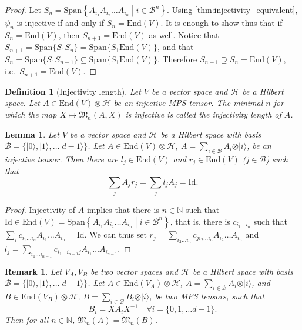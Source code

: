 \documentclass{article}
\newtheorem{lemma}{Lemma}
\newtheorem{remark}{Remark}
\newtheorem{definition}{Definition}
\newcommand{\id}{\mathrm{Id}}
\newcommand{\End}{\mathrm{End}}
\newcommand{\ket}[1]{\vert #1 \rangle}
\newcommand{\Span}{\mathrm{Span}}
\begin{document}
\begin{proof}
  Let $S_n = \Span\left\{A_{i_1} A_{i_2} \dots A_{i_n} \middle| i\in \mathcal{B}^n \right\}$. Using \cref{thm:injectivity_equivalent}, $\psi_n$ is injective if and only if $S_n = \End(V)$. It is enough to show thus that if $S_n = \End(V)$, then $S_{n+1} = \End(V)$ as well. Notice that $S_{n+1} = \Span\{S_1 S_n\} = \Span\{ S_1 \End(V)\}$, and that $S_{n} = \Span\{S_1 S_{n-1}\} \subseteq \Span\{S_1 \End(V)\}$. Therefore $S_{n+1} \supseteq S_n = \End(V)$, i.e.\ $S_{n+1} = \End(V)$. 
\end{proof}

\begin{definition}[Injectivity length]
    Let $V$ be a vector space and $\mathcal{H}$ be a Hilbert space. Let $A\in \End(V)\otimes \mathcal{H}$ be an \emph{injective} MPS tensor. The minimal $n$ for which the map $X\mapsto \mathfrak{M}_n(A,X)$ is injective is called the \emph{injectivity length} of $A$.
\end{definition}

\begin{lemma}\label{lem:injective_l_r_inverse}
  Let $V$ be a vector space and $\mathcal{H}$ be a Hilbert space with basis $\mathcal{B} = \{\ket{0},\ket{1},\dots \ket{d-1}\}$. Let $A\in \End(V)\otimes \mathcal{H}$, $A = \sum_{i\in \mathcal{B}} A_i \otimes \ket{i}$, be an injective tensor. Then there are $l_j\in \End(V)$ and $r_j \in \End(V)$ ($j\in\mathcal{B}$) such that
  \begin{equation*}
    \sum_j A_j r_j = \sum_j l_j A_j = \id.
  \end{equation*} 
\end{lemma}
\begin{proof}
  Injectivity of $A$ implies that there is $n\in\mathbb{N}$ such that $\id\in\End(V) = \Span\left\{A_{i_1} A_{i_2} \dots A_{i_n} \middle| i\in \mathcal{B}^n \right\}$, that is, there is  $c_{i_1\dots i_n}$ such that $\sum_i c_{i_1 \dots i_n} A_{i_1}\dots A_{i_n} = \id$. We can thus set $r_j = \sum_{i_2 \dots i_n} c_{ji_2\dots i_n} A_{i_2}\dots A_{i_n}$ and $l_j = \sum_{i_1 \dots i_{n-1}} c_{i_1\dots i_{n-1}j} A_{i_1}\dots A_{i_{n-1}}$. 
\end{proof}



\begin{remark}
  Let $V_A, V_B$ be two vector spaces and $\mathcal{H}$ be a Hilbert space with basis $\mathcal{B} = \{\ket{0},\ket{1},\dots \ket{d-1}\}$. Let $A\in \End(V_A)\otimes \mathcal{H}$, $A = \sum_{i\in \mathcal{B}} A_i \otimes \ket{i}$, and $B\in \End(V_B)\otimes \mathcal{H}$, $B = \sum_{i\in \mathcal{B}} B_i \otimes \ket{i}$, be two MPS tensors, such that 
  \begin{equation}\label{eq:gauge_1}
    B_i = X A_i X^{-1} \quad \forall i = \{0,1,\dots d-1\}.
  \end{equation}
  Then for all $n\in\mathbb{N}$, $\mathfrak{M}_n(A) = \mathfrak{M}_n(B)$.
\end{remark}
\end{document}
